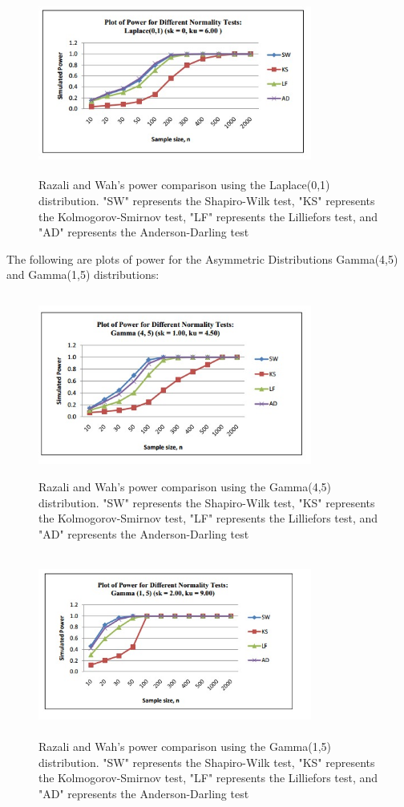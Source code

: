 \documentclass[letterpaper,english, 12pt]{article}
\begin{document}
\begin{figure}[H]
	\centering
	\includegraphics[height=6cm,width=90mm]{pics/razali2.jpg}
	\caption{Razali and Wah's power comparison using the Laplace(0,1) distribution. "SW" represents the Shapiro-Wilk test, "KS" represents the Kolmogorov-Smirnov test, "LF" represents the Lilliefors test, and "AD" represents the Anderson-Darling test}
\end{figure}

The following are plots of power for the Asymmetric Distributions Gamma(4,5) and Gamma(1,5) distributions:

\begin{figure}[H]
	\centering
	\includegraphics[height=6cm,width=90mm]{pics/razali3.jpg}
	\caption{Razali and Wah's power comparison using the Gamma(4,5) distribution. "SW" represents the Shapiro-Wilk test, "KS" represents the Kolmogorov-Smirnov test, "LF" represents the Lilliefors test, and "AD" represents the Anderson-Darling test}
\end{figure}

\begin{figure}[H]
	\centering
	\includegraphics[height=6cm,width=90mm]{pics/razali4.jpg}
	\caption{Razali and Wah's power comparison using the Gamma(1,5) distribution. "SW" represents the Shapiro-Wilk test, "KS" represents the Kolmogorov-Smirnov test, "LF" represents the Lilliefors test, and "AD" represents the Anderson-Darling test}
\end{figure}
\end{document}
